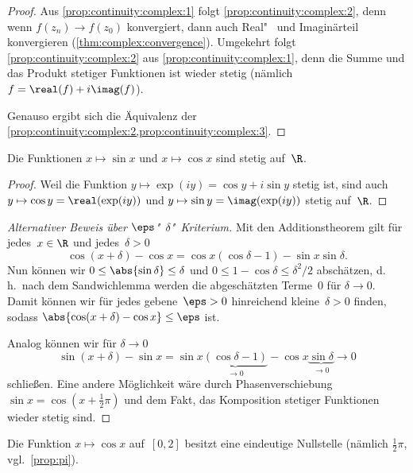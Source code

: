 \documentclass[a4paper]{article}
\begin{document}
\begin{proof}
    Aus \cref{prop:continuity:complex:1} folgt \cref{prop:continuity:complex:2}, denn wenn $f(z_n) \to f(z_0)$ konvergiert, dann auch Real"~ und Imaginärteil konvergieren (\cref{thm:complex:convergence}). Umgekehrt folgt \cref{prop:continuity:complex:2} aus \cref{prop:continuity:complex:1}, denn die Summe und das Produkt stetiger Funktionen ist wieder stetig (nämlich $f = \real(f) + i\imag(f)$).

    Genauso ergibt sich die Äquivalenz der \cref{prop:continuity:complex:2,prop:continuity:complex:3}.
\end{proof}

\begin{corollary}\label{cor:continuity:sincos}
    Die Funktionen $x \mapsto \sin x$ und $x \mapsto \cos x$ sind stetig auf~$\R$.
\end{corollary}

\begin{proof}
    Weil die Funktion $y \mapsto \exp(iy) = \cos y + i\sin y$ stetig ist, sind auch $y \mapsto \cos y = \real(\exp(iy))$ und $y \mapsto \sin y = \imag(\exp(iy))$ stetig auf~$\R$.
\end{proof}

\begin{proof}[Alternativer Beweis über $\eps$"~$\delta$"~Kriterium]
    Mit den Additionstheorem gilt für jedes~$x \in \R$ und jedes~$\delta > 0$
    \begin{equation*}
        \cos(x+\delta) - \cos x = \cos x(\cos\delta-1) - \sin x\sin \delta.
    \end{equation*}
    Nun können wir $0 \leq \abs{\sin\delta} \leq \delta$ und $0 \leq 1-\cos\delta \leq \delta^2/2$ abschätzen, d.\,h.\ nach dem Sandwichlemma werden die abgeschätzten Terme~0 für $\delta \to 0$. Damit können wir für jedes gebene~$\eps > 0$ hinreichend kleine~$\delta > 0$ finden, sodass $\abs{\cos(x+\delta)-\cos x} \leq \eps$ ist.

    Analog können wir für $\delta \to 0$
    \begin{equation*}
        \sin(x+\delta) - \sin x = \sin x\underbrace{(\cos\delta-1)}_{\to 0} - \cos x\underbrace{\sin\delta}_{\to 0} \to 0
    \end{equation*}
    schließen. Eine andere Möglichkeit wäre durch Phasenverschiebung $\sin x = \cos(x+\frac{1}{2}\pi)$ und dem Fakt, das Komposition stetiger Funktionen wieder stetig sind.
\end{proof}

\begin{corollary}\label{cor:coszero}\leavevmode
    Die Funktion $x \mapsto \cos x$ auf~$[0, 2]$ besitzt eine eindeutige Nullstelle (nämlich $\frac{1}{2}\pi$, vgl.\ \cref{prop:pi}).
\end{corollary}
\end{document}
